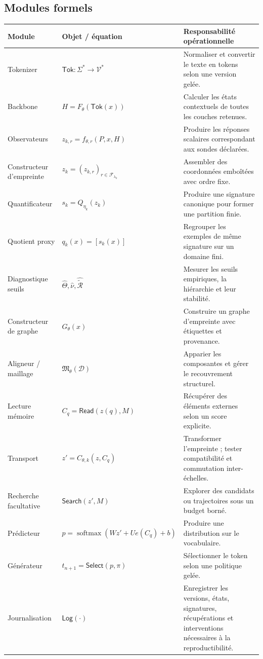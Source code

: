 \documentclass[11pt,a4paper]{article}
\theoremstyle{remark}
\newcommand{\D}{\mathcal D}
\newcommand{\V}{\mathcal V}
\newcommand{\F}{\mathcal F}
\newcommand{\Mesh}{\mathfrak M}
\newcommand{\softmax}{\operatorname{softmax}}
\begin{document}
\subsection{Modules formels}
\begin{longtable}{p{}p{}p{}}
\toprule
\textbf{Module} & \textbf{Objet / équation} & \textbf{Responsabilité opérationnelle}\\
\midrule
Tokenizer & $\mathsf{Tok}:\Sigma^*\to\V^*$ & Normaliser et convertir le texte en tokens selon une version gelée.\\
Backbone & $H=F_\theta(\mathsf{Tok}(x))$ & Calculer les états contextuels de toutes les couches retenues.\\
Observateurs & $z_{k,r}=f_{\theta,r}(P,x,H)$ & Produire les réponses scalaires correspondant aux sondes déclarées.\\
Constructeur d'empreinte & $z_k=(z_{k,r})_{r\in\F_{\lambda_k}}$ & Assembler des coordonnées emboîtées avec ordre fixe.\\
Quantificateur & $s_k=Q_{\eta_k}(z_k)$ & Produire une signature canonique pour former une partition finie.\\
Quotient proxy & $q_k(x)=[s_k(x)]$ & Regrouper les exemples de même signature sur un domaine fini.\\
Diagnostique seuils & $\widehat\Theta,\widehat\nu,\widehat{\widetilde{\mathcal R}}$ & Mesurer les seuils empiriques, la hiérarchie et leur stabilité.\\
Constructeur de graphe & $G_\theta(x)$ & Construire un graphe d'empreinte avec étiquettes et provenance.\\
Aligneur / maillage & $\Mesh_\theta(\D)$ & Apparier les composantes et gérer le recouvrement structurel.\\
Lecture mémoire & $C_q=\mathsf{Read}(z(q),M)$ & Récupérer des éléments externes selon un score explicite.\\
Transport & $z'=C_{\theta,k}(z,C_q)$ & Transformer l'empreinte ; tester compatibilité et commutation inter-échelles.\\
Recherche facultative & $\mathsf{Search}(z',M)$ & Explorer des candidats ou trajectoires sous un budget borné.\\
Prédicteur & $p=\softmax(W z'+U e(C_q)+b)$ & Produire une distribution sur le vocabulaire.\\
Générateur & $t_{n+1}=\mathsf{Select}(p,\pi)$ & Sélectionner le token selon une politique gelée.\\
Journalisation & $\mathsf{Log}(\cdot)$ & Enregistrer les versions, états, signatures, récupérations et interventions nécessaires à la reproductibilité.\\
\bottomrule
\end{longtable}
\end{document}
